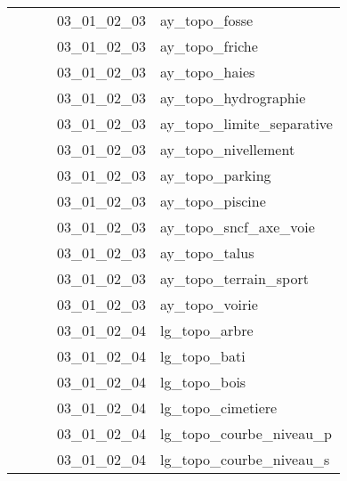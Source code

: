 \documentclass[12pt,titlepage,oneside]{book}
\begin{document}
\begin{supertabular}{|p{7.5cm}|p{7.5cm}|p{7.5cm}|c|p{10cm}|}
                   &                    &                    & 03\_01\_02\_03 & ay\_topo\_fosse\\
                   &                    &                    & 03\_01\_02\_03 & ay\_topo\_friche\\
                   &                    &                    & 03\_01\_02\_03 & ay\_topo\_haies\\
                   &                    &                    & 03\_01\_02\_03 & ay\_topo\_hydrographie\\
                   &                    &                    & 03\_01\_02\_03 & ay\_topo\_limite\_separative\\
                   &                    &                    & 03\_01\_02\_03 & ay\_topo\_nivellement\\
                   &                    &                    & 03\_01\_02\_03 & ay\_topo\_parking\\
                   &                    &                    & 03\_01\_02\_03 & ay\_topo\_piscine\\
                   &                    &                    & 03\_01\_02\_03 & ay\_topo\_sncf\_axe\_voie\\
                   &                    &                    & 03\_01\_02\_03 & ay\_topo\_talus\\
                   &                    &                    & 03\_01\_02\_03 & ay\_topo\_terrain\_sport\\
                   &                    &                    & 03\_01\_02\_03 & ay\_topo\_voirie\\
                   &                    &                    & 03\_01\_02\_04 & lg\_topo\_arbre\\
                   &                    &                    & 03\_01\_02\_04 & lg\_topo\_bati\\
                   &                    &                    & 03\_01\_02\_04 & lg\_topo\_bois\\
                   &                    &                    & 03\_01\_02\_04 & lg\_topo\_cimetiere\\
                   &                    &                    & 03\_01\_02\_04 & lg\_topo\_courbe\_niveau\_p\\
                   &                    &                    & 03\_01\_02\_04 & lg\_topo\_courbe\_niveau\_s\\

\end{supertabular}
\end{document}
